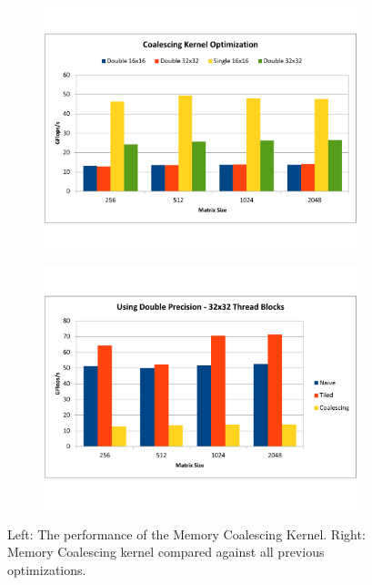 \documentclass[paper=a4, fontsize=11pt]{scrartcl} %
\numberwithin{equation}{section} %
\numberwithin{figure}{section} %
\numberwithin{table}{section} %
\begin{document}
\begin{figure} [h]
\centering
\begin{subfigure}{.5\textwidth}
  \centering
  \includegraphics[width=\linewidth]{figures/coalescing.pdf}
  \label{fig:coalesced}
\end{subfigure}%
\begin{subfigure}{.5\textwidth}
  \centering
  \includegraphics[width=1.03\linewidth]{figures/coalescing_vs_tiled.pdf}
  \label{fig:coalesced_vs_tiled}
\end{subfigure}
\caption{Left: The performance of the Memory Coalescing Kernel. Right: Memory Coalescing kernel compared against all previous optimizations.}
\label{fig:multi4}
\end{figure}
\end{document}
